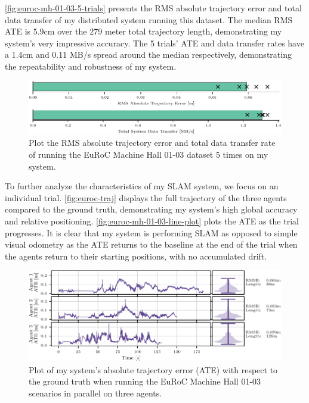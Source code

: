 \autoref{fig:euroc-mh-01-03-5-trials} presents the RMS absolute trajectory error and total data transfer of my distributed system running this dataset. The median RMS ATE is 5.9cm over the 279 meter total trajectory length, demonstrating my system's very impressive accuracy. The 5 trials' ATE and data transfer rates have a 1.4cm and 0.11 MB/s spread around the median respectively, demonstrating the repeatability and robustness of my system.

\begin{figure}[h]
    \centering
    \includegraphics[width=0.8\linewidth]{figures/comparison_apr11_mh_trajectory_b.pdf}

    \caption{Plot the RMS absolute trajectory error and total data transfer rate of running the EuRoC Machine Hall 01-03 dataset 5 times on my system.}
    \label{fig:euroc-mh-01-03-5-trials}
\end{figure}

To further analyze the characteristics of my SLAM system, we focus on an individual trial. \autoref{fig:euroc-traj} displays the full trajectory of the three agents compared to the ground truth, demonstrating my system's high global accuracy and relative positioning. \autoref{fig:euroc-mh-01-03-line-plot} plots the ATE as the trial progresses. It is clear that my system is performing SLAM as opposed to simple visual odometry as the ATE returns to the baseline at the end of the trial when the agents return to their starting positions, with no accumulated drift.

\begin{figure}[h]
    \centering
    \includegraphics[width=0.85\linewidth]{figures/apr11_mh_trajectory_b_line_plot.pdf}

    \caption{Plot of my system's absolute trajectory error (ATE) with respect to the ground truth when running the EuRoC Machine Hall 01-03 scenarios in parallel on three agents.}
    \label{fig:euroc-mh-01-03-line-plot}
\end{figure}

